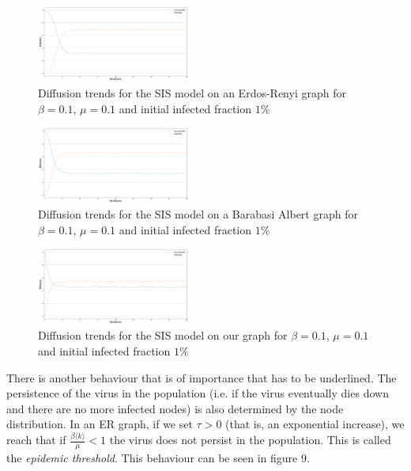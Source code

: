 \documentclass[sigchi]{acmart}
\begin{document}
\begin{figure}[!htbp]
    \centering
    \includegraphics[width=0.45\textwidth]{img/SIS/diffusionERSIS_beta=0.1_mu0.1_frac=0.01.png}
    \caption{Diffusion trends for the SIS model on an Erdos-Renyi graph for $\beta = 0.1$, $\mu = 0.1$ and initial infected fraction $1\%$}
    \label{fig:my_label}
\end{figure}

\begin{figure}[!htbp]
    \centering
    \includegraphics[width=0.45\textwidth]{img/SIS/diffusionBASIS_beta=0.1_mu0.1_frac=0.01.png}
    \caption{Diffusion trends for the SIS model on a Barabasi Albert graph for $\beta = 0.1$, $\mu = 0.1$ and initial infected fraction $1\%$}
    \label{fig:my_label}
\end{figure}

\begin{figure}[!htbp]
    \centering
    \includegraphics[width=0.45\textwidth]{img/SIS/diffusionOurSIS_beta=0.1_mu0.1_frac=0.01.png}
    \caption{Diffusion trends for the SIS model on our graph for $\beta = 0.1$, $\mu = 0.1$ and initial infected fraction $1\%$}
    \label{fig:my_label}
\end{figure}
There is another behaviour that is of importance that has to be underlined. The persistence of the virus in the population (i.e. if the virus eventually dies down and there are no more infected nodes) is also determined by the node distribution. In an ER graph, if we set $\tau >0$ (that is, an exponential increase), we reach that if $\frac{\beta\langle k \rangle}{\mu} < 1$ the virus does not persist in the population. This is called the \textit{epidemic threshold}. This behaviour can be seen in figure 9.
\end{document}
